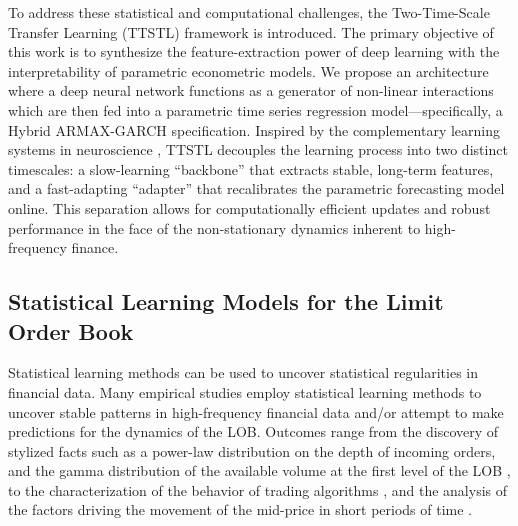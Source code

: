 \documentclass[10pt,a4paper,oneside]{article}
\begin{document}
To address these statistical and computational challenges, the Two-Time-Scale Transfer Learning (TTSTL) framework is introduced. The primary objective of this work is to synthesize the feature-extraction power of deep learning with the interpretability of parametric econometric models. We propose an architecture where a deep neural network functions as a generator of non-linear interactions which are then fed into a parametric time series regression model—specifically, a Hybrid ARMAX-GARCH specification. Inspired by the complementary learning systems in neuroscience \cite{pham_continual_2024}, TTSTL decouples the learning process into two distinct timescales: a slow-learning ``backbone'' that extracts stable, long-term features, and a fast-adapting ``adapter'' that recalibrates the parametric forecasting model online. This separation allows for computationally efficient updates and robust performance in the face of the non-stationary dynamics inherent to high-frequency finance.

\subsection{Statistical Learning Models for the Limit Order Book}
\label{SubSect:LM}
Statistical learning methods \cite{hastie2017elements} can be used to uncover statistical regularities in financial data. Many empirical studies employ statistical learning methods to uncover stable patterns in high-frequency financial data and/or attempt to make predictions for the dynamics of the LOB. Outcomes range from the discovery of stylized facts such as a power-law distribution on the depth of incoming orders, and the gamma distribution of the available volume at the first level of the LOB \cite{Bouchaud_2002}, to the characterization of the behavior of trading algorithms \cite{cartea2023statistical}, and the analysis of the factors driving the movement of the mid-price in short periods of time \cite{cont2013price, cont2023cross, CENESIZOGLU202277}.
\end{document}
